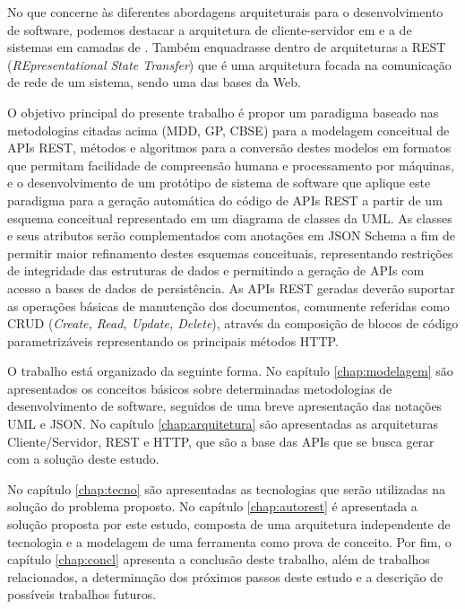 No que concerne às diferentes abordagens arquiteturais para o desenvolvimento de software, podemos destacar a arquitetura de cliente-servidor em  e a de sistemas em camadas de . Também enquadrasse dentro de arquiteturas a REST (\textit{REpresentational State Transfer}) \cite{FIELDING:2000} que é uma arquitetura focada na comunicação de rede de um sistema, sendo uma das bases da Web.

O objetivo principal do presente trabalho é propor um paradigma baseado nas metodologias citadas acima (MDD, GP, CBSE) para a modelagem conceitual de APIs REST, métodos e algoritmos para a conversão destes modelos em formatos que permitam facilidade de compreensão humana e processamento por máquinas, e o desenvolvimento de um protótipo de sistema de software que aplique este paradigma para a geração automática do código de APIs REST a partir de um esquema conceitual representado em um diagrama de classes da UML. As classes e seus atributos serão complementados com anotações em JSON Schema a fim de permitir maior refinamento destes esquemas conceituais, representando restrições de integridade das estruturas de dados e permitindo a geração de APIs com acesso a bases de dados de persistência. As APIs REST geradas deverão suportar as operações básicas de manutenção dos documentos, comumente referidas como CRUD (\textit{Create, Read, Update, Delete}), através da composição de blocos de código parametrizáveis representando os principais métodos HTTP.

O trabalho está organizado da seguinte forma. No capítulo \ref{chap:modelagem} são apresentados os conceitos básicos sobre determinadas metodologias de desenvolvimento de software, seguidos de uma breve apresentação das notações UML e JSON. No capítulo \ref{chap:arquitetura} são apresentadas as arquiteturas Cliente/Servidor, REST e HTTP, que são a base das APIs que se busca gerar com a solução deste estudo.

No capítulo \ref{chap:tecno} são apresentadas as tecnologias que serão utilizadas na solução do problema proposto. No capítulo \ref{chap:autorest} é apresentada a solução proposta por este estudo, composta de uma arquitetura independente de tecnologia e a modelagem de uma ferramenta como prova de conceito. Por fim, o capítulo \ref{chap:concl} apresenta a conclusão deste trabalho, além de trabalhos relacionados, a determinação dos próximos passos deste estudo e a descrição de possíveis trabalhos futuros.